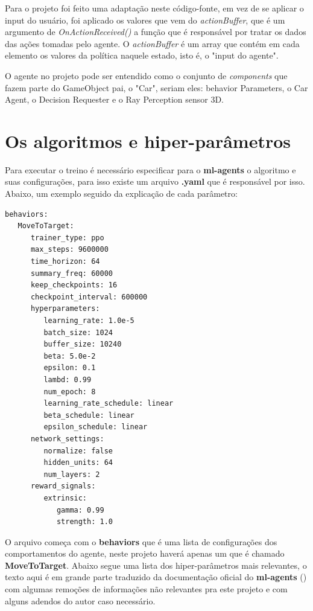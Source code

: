 Para o projeto foi feito uma adaptação neste código-fonte, em vez de se aplicar o input do usuário, foi aplicado os valores que vem do \textit{actionBuffer}, que é um argumento de \textit{OnActionReceived()} a função que é responsável por tratar os dados das ações tomadas pelo agente. O \textit{actionBuffer} é um array que contém em cada elemento os valores da política naquele estado, isto é, o "input do agente".

O agente no projeto pode ser entendido como o conjunto de \textit{components} que fazem parte do GameObject pai, o "Car", seriam eles: behavior Parameters, o Car Agent, o Decision Requester e o Ray Perception sensor 3D. 

\section{Os algoritmos e hiper-parâmetros}\label{algoritmos}
Para executar o treino é necessário especificar para o \textbf{ml-agents} o algoritmo e suas configurações, para isso existe um arquivo \textbf{.yaml} que é responsável por isso. Abaixo, um exemplo seguido da explicação de cada parâmetro:

\begin{lstlisting}
behaviors:
   MoveToTarget:
      trainer_type: ppo
      max_steps: 9600000
      time_horizon: 64
      summary_freq: 60000
      keep_checkpoints: 16     
      checkpoint_interval: 600000
      hyperparameters:
         learning_rate: 1.0e-5
         batch_size: 1024
         buffer_size: 10240
         beta: 5.0e-2
         epsilon: 0.1
         lambd: 0.99
         num_epoch: 8
         learning_rate_schedule: linear
         beta_schedule: linear
         epsilon_schedule: linear
      network_settings:
         normalize: false
         hidden_units: 64
         num_layers: 2
      reward_signals:
         extrinsic:
            gamma: 0.99
            strength: 1.0
\end{lstlisting}

O arquivo começa com o \textbf{behaviors} que é uma lista de configurações dos comportamentos do agente, neste projeto haverá apenas um que é chamado \textbf{MoveToTarget}. Abaixo segue uma lista dos hiper-parâmetros mais relevantes, o texto aqui é em grande parte traduzido da documentação oficial do \textbf{ml-agents} () com algumas remoções de informações não relevantes pra este projeto e com alguns adendos do autor caso necessário.

